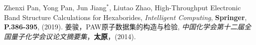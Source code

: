 \documentclass{article}      %
\begin{document}
\begin{thebibliography}{99}																		%
	 \textrm{Zhenxi Pan, Yong Pan, Jun Jiang$^{\ast}$, Liutao Zhao}, \textrm{High-Throughput Electronic Band Structure Calculations for Hexaborides}, \textit{Intelligent Computing}, \textbf{Springer}, \textbf{P.386-395}, (2019).%
	 \textrm{姜骏}，\textrm{PAW原子数据集的构造与检验}, \textit{中国化学会第十二届全国量子化学会议论文摘要集}，\textbf{太原}，(2014).
\end{thebibliography}																			%

\clearpage     
\end{document}
